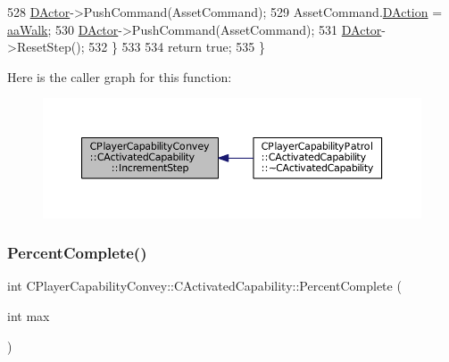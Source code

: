 \begin{DoxyCode}
528         \hyperlink{classCActivatedPlayerCapability_a54ca944b47bff2718330639941d402b0}{DActor}->PushCommand(AssetCommand);
529         AssetCommand.\hyperlink{structSAssetCommand_a8edd3b3d59a76d5514ba403bc8076a75}{DAction} = \hyperlink{GameDataTypes_8h_ab47668e651a3032cfb9c40ea2d60d670a60ca9010aa62b73c1aab838ff4bf7276}{aaWalk};
530         \hyperlink{classCActivatedPlayerCapability_a54ca944b47bff2718330639941d402b0}{DActor}->PushCommand(AssetCommand);
531         \hyperlink{classCActivatedPlayerCapability_a54ca944b47bff2718330639941d402b0}{DActor}->ResetStep();
532     \}
533     
534     \textcolor{keywordflow}{return} \textcolor{keyword}{true};
535 \}
\end{DoxyCode}
Here is the caller graph for this function\+:
\nopagebreak
\begin{figure}[H]
\begin{center}
\leavevmode
\includegraphics[width=350pt]{classCPlayerCapabilityConvey_1_1CActivatedCapability_ac1bf251eca552885041b1bcefa594591_icgraph}
\end{center}
\end{figure}
\hypertarget{classCPlayerCapabilityConvey_1_1CActivatedCapability_aec6b75fc004f4ac18755d8f601c8ffca}{}\label{classCPlayerCapabilityConvey_1_1CActivatedCapability_aec6b75fc004f4ac18755d8f601c8ffca} 
\subsubsection{\texorpdfstring{Percent\+Complete()}{PercentComplete()}}
{\footnotesize\ttfamily int C\+Player\+Capability\+Convey\+::\+C\+Activated\+Capability\+::\+Percent\+Complete (\begin{DoxyParamCaption}\item[{int}]{max }\end{DoxyParamCaption})\hspace{0.3cm}{\ttfamily [virtual]}}



